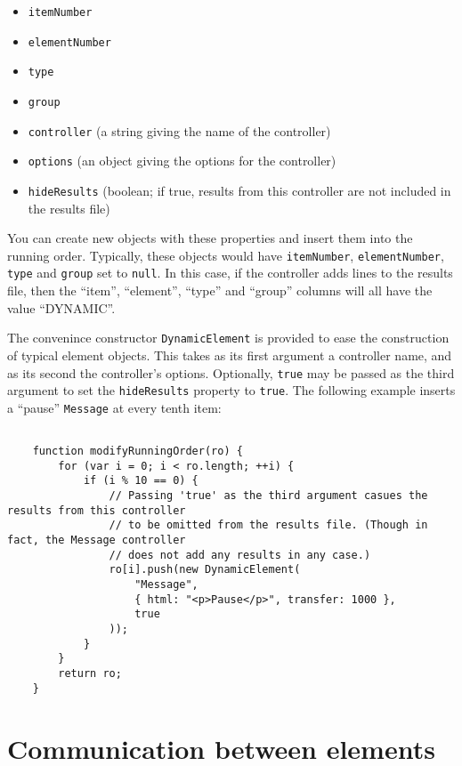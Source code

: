 \documentclass[11pt,letterpaper]{article}
\begin{document}
\begin{itemize}

\item
 \texttt{itemNumber}
\item
 \texttt{elementNumber}
\item
 \texttt{type}
\item
 \texttt{group}
\item
 \texttt{controller} (a string giving the name of the controller)
\item
 \texttt{options} (an object giving the options for the controller)
\item
 \texttt{hideResults} (boolean; if true, results from this controller are not included in the results file)
\end{itemize}
You can create new objects with these properties and insert them into
the running order.  Typically, these objects would have \texttt{itemNumber},
\texttt{elementNumber}, \texttt{type} and \texttt{group} set to \texttt{null}. In this case, if
the controller adds lines to the results file, then the ``item'',
``element'', ``type'' and ``group'' columns will all have the value
``DYNAMIC''.

The convenince constructor \texttt{DynamicElement} is provided to ease the construction
of typical element objects. This takes as its first argument a controller name,
and as its second the controller's options. Optionally, \texttt{true} may be passed as the
third argument to set the \texttt{hideResults} property to \texttt{true}.
The following example inserts a ``pause'' \texttt{Message} at every tenth item:
\footnotesize\begin{verbatim}

    function modifyRunningOrder(ro) {
        for (var i = 0; i < ro.length; ++i) {
            if (i % 10 == 0) {
                // Passing 'true' as the third argument casues the results from this controller
                // to be omitted from the results file. (Though in fact, the Message controller
                // does not add any results in any case.)
                ro[i].push(new DynamicElement(
                    "Message",
                    { html: "<p>Pause</p>", transfer: 1000 },
                    true
                ));
            }
        }
        return ro;
    }
\end{verbatim}

\smallskip\noindent\normalsize


\section{Communication between elements}
\end{document}
